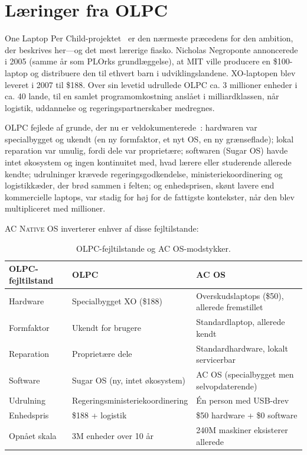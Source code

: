 \documentclass[10pt,letterpaper,twocolumn]{article}
\newcommand{\acos}{\textsc{AC Native OS}}
\begin{document}

\section{L{\ae}ringer fra OLPC}
\label{sec:olpc}

One Laptop Per Child-projektet~\citep{negroponte1995being, kraemer2009olpc} er den n{\ae}rmeste pr{\ae}cedens for den ambition, der beskrives her---og det mest l{\ae}rerige fiasko. Nicholas Negroponte annoncerede i 2005 (samme {\aa}r som PLOrks grundl{\ae}ggelse), at MIT ville producere en \$100-laptop og distribuere den til ethvert barn i udviklingslandene. XO-laptopen blev leveret i 2007 til \$188. Over sin levetid udrullede OLPC ca. 3 millioner enheder i ca. 40 lande, til en samlet programomkostning ansl{\aa}et i milliardklassen, n{\aa}r logistik, uddannelse og regeringspartnerskaber medregnes.

OLPC fejlede af grunde, der nu er veldokumenterede~\citep{kraemer2009olpc}: hardwaren var specialbygget og ukendt (en ny formfaktor, et nyt OS, en ny gr{\ae}nseflade); lokal reparation var umulig, fordi dele var propriet{\ae}re; softwaren (Sugar OS) havde intet {\o}kosystem og ingen kontinuitet med, hvad l{\ae}rere eller studerende allerede kendte; udrulninger kr{\ae}vede regeringsgodkendelse, ministeriekoordinering og logistikk{\ae}der, der brød sammen i felten; og enhedsprisen, sk{\o}nt lavere end kommercielle laptops, var stadig for h{\o}j for de fattigste kontekster, n{\aa}r den blev multipliceret med millioner.

\acos{} inverterer enhver af disse fejltilstande:

\begin{table}[h]
\small
\centering
\begin{tabularx}{\columnwidth}{lXX}
\toprule
\textbf{OLPC-fejltilstand} & \textbf{OLPC} & \textbf{AC OS} \\
\midrule
Hardware & Specialbygget XO (\$188) & Overskudslaptops (\$50), allerede fremstillet \\
Formfaktor & Ukendt for brugere & Standardlaptop, allerede kendt \\
Reparation & Propriet{\ae}re dele & Standardhardware, lokalt servicerbar \\
Software & Sugar OS (ny, intet {\o}kosystem) & AC OS (specialbygget men selvopdaterende) \\
Udrulning & Regeringsministeriekoordinering & \'{E}n person med USB-drev \\
Enhedspris & \$188 + logistik & \$50 hardware + \$0 software \\
Opn{\aa}et skala & 3M enheder over 10 {\aa}r & 240M maskiner eksisterer allerede \\
\bottomrule
\end{tabularx}
\caption{OLPC-fejltilstande og AC OS-modstykker.}
\label{tab:olpc}
\end{table}
\end{document}
